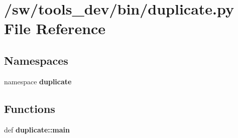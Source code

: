 \section{/sw/tools\_\-dev/bin/duplicate.py File Reference}
\label{duplicate_8py}
\subsection*{Namespaces}
\begin{CompactItemize}
\item 
namespace {\bf duplicate}
\end{CompactItemize}
\subsection*{Functions}
\begin{CompactItemize}
\item 
def {\bf duplicate::main}
\end{CompactItemize}
